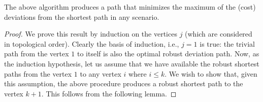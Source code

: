 \begin{thm}
The above algorithm produces a path that minimizes the maximum of the (cost) deviations from the shortest path in any scenario.
\end{thm}

\begin{proof}
We prove this result by induction on the vertices $j$ (which are considered in topological order). Clearly the basis of induction, i.e., $j=1$ is true: the trivial path from the vertex $1$ to itself is also the optimal robust deviation path. Now, as the induction hypothesis, let us assume that we have available the robust shortest paths from the vertex $1$ to any vertex $i$ where $i \le k$. We wish to show that, given this assumption, the above procedure produces a robust shortest path to the vertex $k+1$. This follows from the following lemma.
\end{proof}


